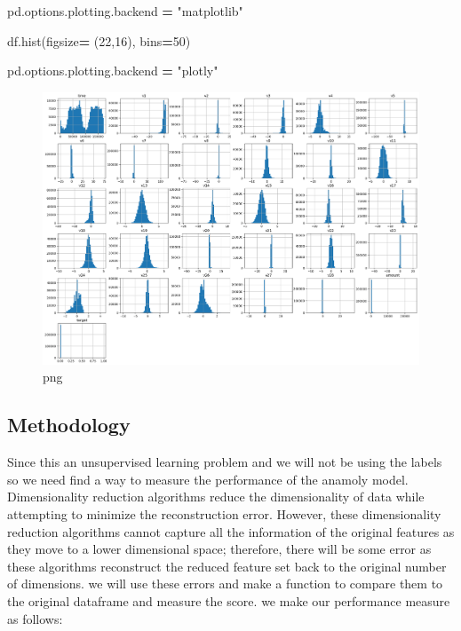 \documentclass[
]{article}
\newenvironment{Shaded}{\begin{snugshade}}{\end{snugshade}}
\newcommand{\DecValTok}[1]{\textcolor[rgb]{0.00,0.00,0.81}{#1}}
\newcommand{\NormalTok}[1]{#1}
\newcommand{\OperatorTok}[1]{\textcolor[rgb]{0.81,0.36,0.00}{\textbf{#1}}}
\newcommand{\StringTok}[1]{\textcolor[rgb]{0.31,0.60,0.02}{#1}}
\begin{document}
\begin{Shaded}
\begin{Highlighting}[]
\NormalTok{pd.options.plotting.backend }\OperatorTok{=} \StringTok{"matplotlib"}

\NormalTok{df.hist(figsize}\OperatorTok{=}\NormalTok{ (}\DecValTok{22}\NormalTok{,}\DecValTok{16}\NormalTok{), bins}\OperatorTok{=}\DecValTok{50}\NormalTok{)}

\NormalTok{pd.options.plotting.backend }\OperatorTok{=} \StringTok{"plotly"}
\end{Highlighting}
\end{Shaded}

\begin{figure}
\centering
\includegraphics{mymarkdownfile_files/mymarkdownfile_15_0.png}
\caption{png}
\end{figure}

\hypertarget{methodology}{%
\subsection{Methodology}\label{methodology}}

Since this an unsupervised learning problem and we will not be using the
labels so we need find a way to measure the performance of the anamoly
model. Dimensionality reduction algorithms reduce the dimensionality of
data while attempting to minimize the reconstruction error. However,
these dimensionality reduction algorithms cannot capture all the
information of the original features as they move to a lower dimensional
space; therefore, there will be some error as these algorithms
reconstruct the reduced feature set back to the original number of
dimensions. we will use these errors and make a function to compare them
to the original dataframe and measure the score. we make our performance
measure as follows:
\end{document}
